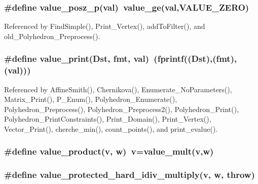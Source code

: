 \subsubsection{\setlength{\rightskip}{0pt plus 5cm}\#define value\_\-posz\_\-p(val)\ value\_\-ge(val,VALUE\_\-ZERO)}\label{arithmetique_8h_a65}




Referenced by Find\-Simple(), Print\_\-Vertex(), add\-To\-Filter(), and old\_\-Polyhedron\_\-Preprocess().

\subsubsection{\setlength{\rightskip}{0pt plus 5cm}\#define value\_\-print(Dst, fmt, val)\ (fprintf((Dst),(fmt),(val)))}\label{arithmetique_8h_a16}




Referenced by Affine\-Smith(), Chernikova(), Enumerate\_\-No\-Parameters(), Matrix\_\-Print(), P\_\-Enum(), Polyhedron\_\-Enumerate(), Polyhedron\_\-Preprocess(), Polyhedron\_\-Preprocess2(), Polyhedron\_\-Print(), Polyhedron\_\-Print\-Constraints(), Print\_\-Domain(), Print\_\-Vertex(), Vector\_\-Print(), cherche\_\-min(), count\_\-points(), and print\_\-evalue().

\subsubsection{\setlength{\rightskip}{0pt plus 5cm}\#define value\_\-product(v, w)\ v=value\_\-mult(v,w)}\label{arithmetique_8h_a82}


\subsubsection{\setlength{\rightskip}{0pt plus 5cm}\#define value\_\-protected\_\-hard\_\-idiv\_\-multiply(v, w, throw)}\label{arithmetique_8h_a77}


